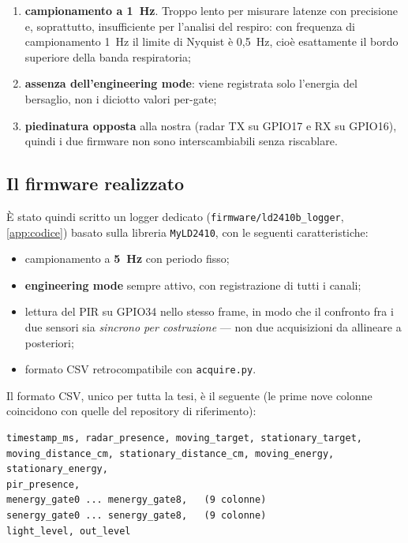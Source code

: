 \begin{enumerate}[leftmargin=1.8em,itemsep=3pt]
  \item \textbf{campionamento a 1~Hz}. Troppo lento per misurare latenze con
        precisione e, soprattutto, insufficiente per l'analisi del respiro: con
        frequenza di campionamento 1~Hz il limite di Nyquist è 0,5~Hz, cioè
        esattamente il bordo superiore della banda respiratoria;
  \item \textbf{assenza dell'engineering mode}: viene registrata solo l'energia del
        bersaglio, non i diciotto valori per-gate;
  \item \textbf{piedinatura opposta} alla nostra (radar TX su GPIO17 e RX su
        GPIO16), quindi i due firmware non sono interscambiabili senza riscablare.
\end{enumerate}

\subsection{Il firmware realizzato}

È stato quindi scritto un logger dedicato
(\texttt{firmware/ld2410b\_logger}, \cref{app:codice}) basato sulla libreria
\texttt{MyLD2410}, con le seguenti caratteristiche:

\begin{itemize}[leftmargin=1.4em,itemsep=2pt]
  \item campionamento a \textbf{5~Hz} con periodo fisso;
  \item \textbf{engineering mode} sempre attivo, con registrazione di tutti i
        canali;
  \item lettura del PIR su GPIO34 nello stesso frame, in modo che il confronto fra i
        due sensori sia \emph{sincrono per costruzione} --- non due acquisizioni da
        allineare a posteriori;
  \item formato CSV retrocompatibile con \texttt{acquire.py}.
\end{itemize}

Il formato CSV, unico per tutta la tesi, è il seguente (le prime nove colonne
coincidono con quelle del repository di riferimento):

\begin{lstlisting}[caption={Intestazione del CSV prodotto dal logger, in
engineering mode.},label={lst:csv},basicstyle=\ttfamily\scriptsize]
timestamp_ms, radar_presence, moving_target, stationary_target,
moving_distance_cm, stationary_distance_cm, moving_energy, stationary_energy,
pir_presence,
menergy_gate0 ... menergy_gate8,   (9 colonne)
senergy_gate0 ... senergy_gate8,   (9 colonne)
light_level, out_level
\end{lstlisting}


